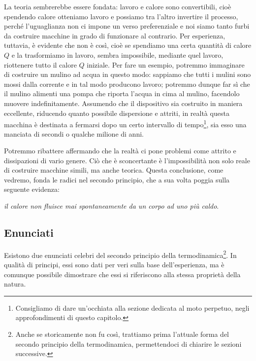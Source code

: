 \noindent La teoria sembrerebbe essere fondata: lavoro e calore sono
convertibili, cioè spendendo calore otteniamo lavoro e possiamo tra l'altro
invertire il processo, perché l'uguaglianza non ci impone un
verso preferenziale e noi siamo tanto furbi da costruire macchine
in grado di funzionare al contrario. Per esperienza, tuttavia, è evidente che non
è così, cioè se spendiamo una certa quantità di calore $Q$ e
la trasformiamo in lavoro, sembra impossibile, mediante quel lavoro,
riottenere tutto il calore $Q$ iniziale. Per fare un esempio, potremmo
immaginare di costruire un mulino ad acqua in questo modo: sappiamo che
tutti i mulini sono mossi dalla corrente e in tal modo producono
lavoro; potremmo dunque far sì che il mulino alimenti una pompa che
riporta l'acqua in cima al mulino, facendolo muovere indefinitamente.
Assumendo che il dispositivo sia costruito in maniera
eccellente, riducendo quanto possibile dispersione e attriti,
in realtà questa macchina è destinata a fermarsi dopo un certo
intervallo di tempo\footnote{Consigliamo di dare un'occhiata alla
sezione dedicata al moto perpetuo, negli approfondimenti di questo
capitolo.}, sia esso una manciata di secondi o qualche milione di
anni.

Potremmo ribattere affermando che la realtà ci pone problemi come
attrito e dissipazioni di vario genere. Ciò che è sconcertante è
l'impossibilità non solo reale di costruire macchine simili,
ma anche teorica. Questa conclusione, come vedremo, fonda
le radici nel secondo principio, che a sua volta poggia sulla
seguente evidenza:

\begin{center}
    \textit{il calore non fluisce \emph{mai spontaneamente} da un corpo ad uno più caldo}.
\end{center}

\subsection{Enunciati}
Esistono due enunciati celebri del secondo principio della termodinamica\footnote{Anche se storicamente non fu così, trattiamo prima l'attuale forma
del secondo principio della termodinamica, permettendoci di chiarire
le sezioni successive.}.
In qualità di principi, essi sono dati per veri sulla base dell'esperienza,
ma è comunque possibile dimostrare che essi si riferiscono alla
stessa proprietà della natura.

